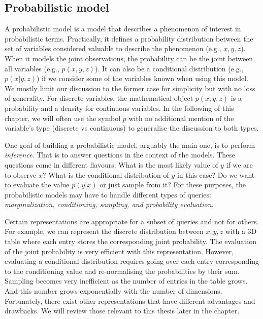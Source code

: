 \subsection{Probabilistic model}
A probabilistic model is a model that describes a phenomenon of interest in probabilistic terms. Practically, it defines a probability distribution between the set of variables considered valuable to describe the phenomenon (e.g., $x, y, z$). When it models the joint observations, the probability can be the joint between all variables (e.g., $p(x, y, z)$). It can also be a conditional distribution  (e.g., $p(x | y, z)$) if we consider some of the variables known when using this model. We mostly limit our discussion to the former case for simplicity but with no loss of generality. For discrete variables, the mathematical object $p(x, y, z)$ is a probability and a density for continuous variables. In the following of this chapter, we will often use the symbol $p$ with no additional mention of the variable's type (discrete vs continuous) to generalise the discussion to both types.

One goal of building a probabilistic model, arguably the main one, is to perform \textit{inference}. That is to answer questions in the context of the models. These questions come in different flavours. What is the most likely value of $y$ if we are to observe $x$? What is the conditional distribution of $y$ in this case? Do we want to evaluate the value $p(y|x)$ or just sample from it? For these purposes, the probabilistic models may have to handle different types of queries: \textit{marginalization, conditioning, sampling, and probability evaluation}.

Certain representations are appropriate for a subset of queries and not for others. For example, we can represent the discrete distribution between $x, y, z$ with a $3$D table where each entry stores the corresponding joint probability. The evaluation of the joint probability is very efficient with this representation. However, evaluating a conditional distribution requires going over each entry corresponding to the conditioning value and re-normalising the probabilities by their sum. Sampling becomes very inefficient as the number of entries in the table grows. And this number grows exponentially with the number of dimensions. Fortunately, there exist other representations that have different advantages and drawbacks. We will review those relevant to this thesis later in the chapter.

